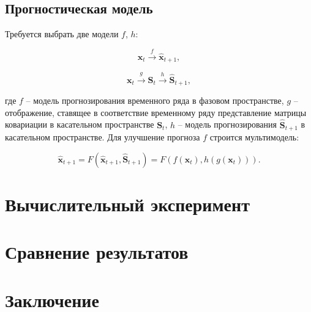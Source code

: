 \documentclass{article}
\begin{document}
\subsection{Прогностическая модель}

Требуется выбрать две модели $f$, $h$:

\begin{equation}
    \mathbf{x}_t \xrightarrow{f} \hat{\mathbf{x}}_{t+1},
\end{equation}

\begin{equation}
    \mathbf{x}_t \xrightarrow{g} \mathbf{S}_{t} \xrightarrow{h} \hat{\mathbf{S}}_{t + 1},
\end{equation}

где $f$ -- модель прогнозирования временного ряда в фазовом пространстве, $g$ -- отображение, ставящее в соответствие временному ряду представление матрицы ковариации в касательном пространстве $\mathbf{S}_t$, $h$ -- модель прогнозирования $\hat{\mathbf{S}}_{t + 1}$ в касательном пространстве. Для улучшение прогноза $f$ строится мультимодель:

\begin{equation}
    \hat{\mathbf{x}}_{t + 1} = F(\hat{\mathbf{x}}_{t + 1}, \hat{\mathbf{S}}_{t + 1}) = F(f(\mathbf{x}_t), h(g(\mathbf{x}_t))).
\end{equation}

\section{Вычислительный эксперимент}

\section{Сравнение результатов}

\section{Заключение}




\end{document}
